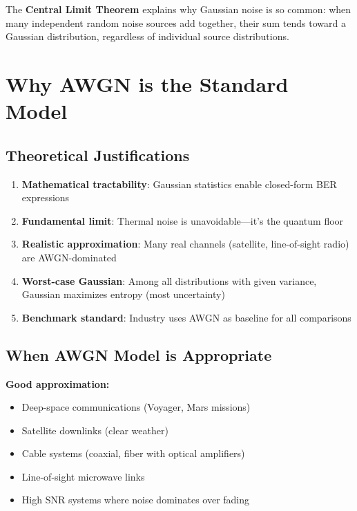 \begin{keyconcept}
The \textbf{Central Limit Theorem} explains why Gaussian noise is so common: when many independent random noise sources add together, their sum tends toward a Gaussian distribution, regardless of individual source distributions.
\end{keyconcept}

\section{Why AWGN is the Standard Model}

\subsection{Theoretical Justifications}

\begin{enumerate}
\item \textbf{Mathematical tractability}: Gaussian statistics enable closed-form BER expressions
\item \textbf{Fundamental limit}: Thermal noise is unavoidable---it's the quantum floor
\item \textbf{Realistic approximation}: Many real channels (satellite, line-of-sight radio) are AWGN-dominated
\item \textbf{Worst-case Gaussian}: Among all distributions with given variance, Gaussian maximizes entropy (most uncertainty)
\item \textbf{Benchmark standard}: Industry uses AWGN as baseline for all comparisons
\end{enumerate}

\subsection{When AWGN Model is Appropriate}

\textbf{Good approximation:}
\begin{itemize}
\item Deep-space communications (Voyager, Mars missions)
\item Satellite downlinks (clear weather)
\item Cable systems (coaxial, fiber with optical amplifiers)
\item Line-of-sight microwave links
\item High SNR systems where noise dominates over fading
\end{itemize}

